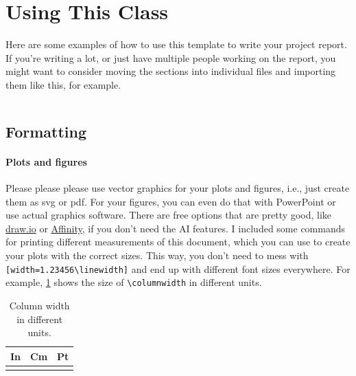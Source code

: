 \documentclass{3s-report}
\begin{document}
    \maketitle

    \section{Using This Class}\label{sec:intro}
    Here are some examples of how to use this template to write your project report.
    If you're writing a lot, or just have multiple people working on the report, you might want to consider moving the sections into individual files and importing them like this, for example.

    \begin{verbatim}

    \end{verbatim}

    \subsection{Formatting}

    \paragraph{Plots and figures}
    Please please please use vector graphics for your plots and figures, i.e., just create them as svg or pdf.
    For your figures, you can even do that with PowerPoint or use actual graphics software.
    There are free options that are pretty good, like \href{https://draw.io}{draw.io} or \href{https://www.affinity.studio/}{Affinity}, if you don't need the AI features.
    I included some commands for printing different measurements of this document, which you can use to create your plots with the correct sizes.
    This way, you don't need to mess with \texttt{[width=1.23456\textbackslash linewidth]} and end up with different font sizes everywhere.
    For example, \cref{table:measurements} shows the size of \texttt{\textbackslash columnwidth} in different units.
    \begin{table}[!h]
        \noindent\begin{tabularx}{\linewidth}{ X X X }
            \toprule
            \bf{In} & \bf{Cm} & \bf{Pt} \\
            \midrule
            \measurein{\columnwidth} & \measurecm{\columnwidth} & \measurept{\columnwidth} \\
            \bottomrule
        \end{tabularx}
        \caption{Column width in different units.}
        \label{table:measurements}
    \end{table}
\end{document}

